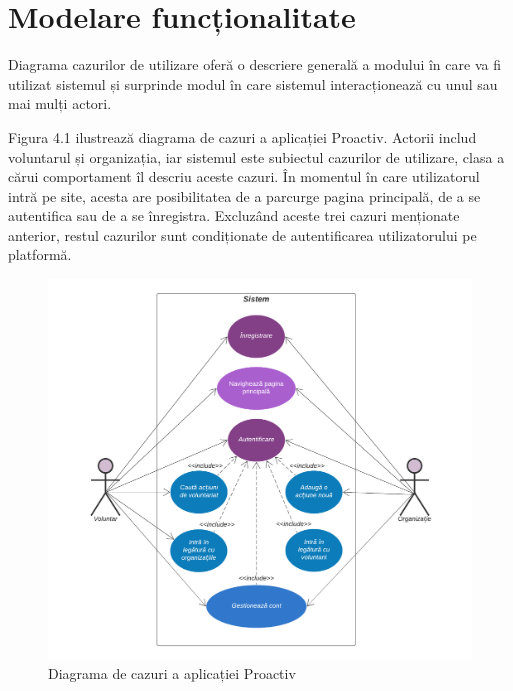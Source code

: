 \documentclass[12pt,a4paper]{report}
\begin{document}
\section{Modelare funcționalitate}
\par
Diagrama cazurilor de utilizare oferă o descriere generală a modului în care va fi utilizat sistemul și surprinde modul în care sistemul interacționează cu unul sau mai mulți actori.\cite{usecases}
\\
\par
Figura 4.1 ilustrează diagrama de cazuri a aplicației Proactiv. Actorii includ voluntarul și organizația, iar sistemul este subiectul cazurilor de utilizare, clasa a cărui comportament îl descriu aceste cazuri. 
În momentul în care utilizatorul intră pe site, acesta are posibilitatea de a parcurge pagina principală, de a se autentifica sau de a se înregistra. Excluzând aceste trei cazuri menționate anterior, restul cazurilor sunt condiționate de autentificarea utilizatorului pe platformă.
\\
\begin{figure}[h!]
  \centering
    \includegraphics[width=0.7\linewidth]{./imagini/UseCase.png}
    \caption{Diagrama de cazuri a aplicației Proactiv}
\end{figure}
\end{document}
